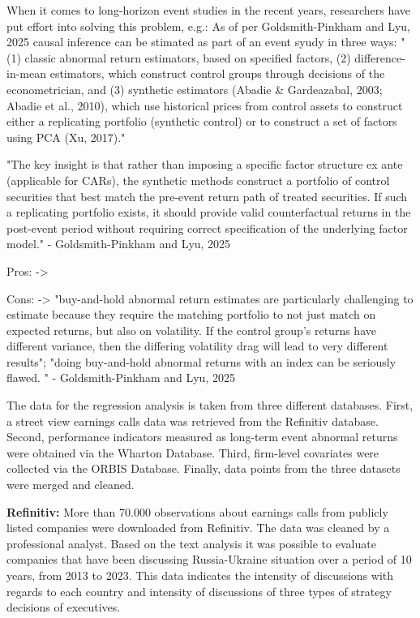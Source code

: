 \documentclass[12pt,a4paper]{article}
\begin{document}
When it comes to long-horizon event studies in the recent years, researchers have put effort into solving this problem, e.g.: 
As of per Goldsmith-Pinkham and Lyu, 2025 causal inference can be stimated as part of an event syudy in three ways:
"(1) classic abnormal return estimators, based on specified factors, 
 (2) difference-in-mean estimators, which construct control groups through decisions of the econometrician, and 
 (3) synthetic estimators (Abadie \& Gardeazabal, 2003; Abadie et al., 2010), which use historical prices from control assets to construct either a replicating portfolio (synthetic control) or to construct a set of factors using PCA (Xu, 2017)."

"The key insight is that rather than imposing a specific factor structure ex ante (applicable for CARs), the synthetic methods construct a portfolio of control securities that best match the pre-event return path of treated securities. If such a replicating portfolio exists, it should provide valid counterfactual returns in the post-event period without requiring correct specification of the underlying factor model." - Goldsmith-Pinkham and Lyu, 2025



Pros:
-> 

Cons: 
-> "buy-and-hold abnormal return estimates are particularly challenging to estimate because they require the matching portfolio to not just match on expected returns, but also on volatility. If the control group’s returns have different variance, then the differing volatility drag will lead to very different results"; "doing buy-and-hold abnormal returns with an index can be seriously flawed. "  - Goldsmith-Pinkham and Lyu, 2025




The data for the regression analysis is taken from three different databases. First, a street view earnings calls data was retrieved from the Refinitiv database. Second, performance indicators measured as long-term event abnormal returns were obtained via the Wharton Database. Third, firm-level covariates were collected via the ORBIS Database. Finally, data points from the three datasets were merged and cleaned. 

\textbf{Refinitiv:} More than 70.000 observations about earnings calls from publicly listed companies were downloaded from Refinitiv. The data was cleaned by a professional analyst. Based on the text analysis it was possible to evaluate companies that have been discussing Russia-Ukraine situation over a period of 10 years, from 2013 to 2023. This data indicates the intensity of discussions with regards to each country and intensity of discussions of three types of strategy decisions of executives.
\end{document}
